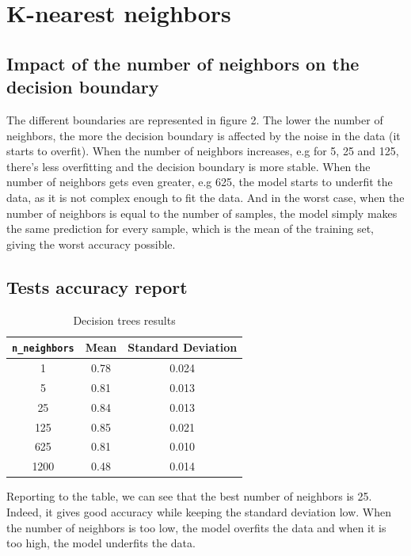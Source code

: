 \documentclass[12pt]{article}
\begin{document}
\newpage
\section{K-nearest neighbors}
	\subsection{Impact of the number of neighbors on the decision boundary}
 		The different boundaries are represented in figure 2. The lower the number of neighbors, the more the decision boundary is affected by the noise in the data (it starts to overfit). 
		When the number of neighbors increases, e.g for 5, 25 and 125, there's less overfitting and the decision boundary is more stable.
		When the number of neighbors gets even greater, e.g 625, the model starts to underfit the data, as it is not complex enough to fit the data.
		And in the worst case, when the number of neighbors is equal to the number of samples, the model simply makes the same prediction for every sample, which is the mean of the training set, giving the worst accuracy possible.

\subsection{Tests accuracy report}
	\begin{table}[!h]
		\centering
		\begin{tabular}{|c|c|c|}
		\hline
		\verb|n_neighbors| & Mean & Standard Deviation \\ \hline
		1                                & 0.78 & 0.024              \\ \hline
		5                                & 0.81 & 0.013              \\ \hline
		25                                & 0.84 & 0.013              \\ \hline
		125                               & 0.85 & 0.021              \\ \hline
		625                             & 0.81 & 0.010               \\ \hline
		1200                             & 0.48 & 0.014               \\ \hline

		\end{tabular}
		\caption{Decision trees results}
		\label{tab:results-knn}
	\end{table}
Reporting to the table, we can see that the best number of neighbors is 25. 
Indeed, it gives good accuracy while keeping the standard deviation low. 
When the number of neighbors is too low, the model overfits the data and when it is too high, the model underfits the data.
\end{document}

